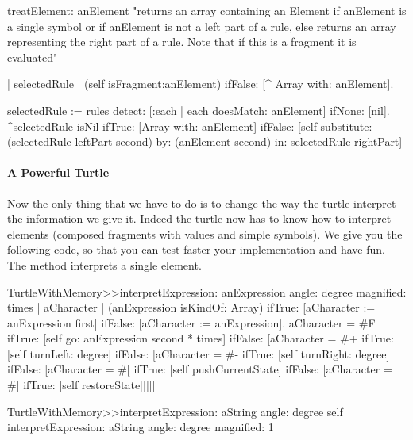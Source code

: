 \begin{method}
treatElement: anElement 
   "returns an array containing an Element if anElement is a single symbol
   or if anElement is not a left part of a rule, else returns an array representing the    
   right part of a rule. Note that if this is a fragment it is evaluated"
        
   | selectedRule |
   (self isFragment:anElement) 
          ifFalse: [^ Array with: anElement].

   selectedRule := rules detect: [:each | each doesMatch: anElement]
                         ifNone: [nil].
   ^selectedRule isNil 
       ifTrue: [Array with: anElement]
       ifFalse: [self substitute: (selectedRule leftPart second)                        
                      by: (anElement second)  
                      in: selectedRule rightPart]
\end{method}

\paragraph{A Powerful Turtle}
Now the only thing that we have to do is to change the way the turtle
interpret the information we give it. Indeed the turtle now has to
know how to interpret elements (composed fragments with values and
simple symbols). We give you the following code, so that you can test
faster your implementation and have fun.  The method
interprets a single element.

\begin{method}
TurtleWithMemory>>interpretExpression: anExpression angle: degree magnified: times 
   | aCharacter |
   (anExpression isKindOf: Array)
      ifTrue: [aCharacter := anExpression first]
      ifFalse: [aCharacter := anExpression].
   aCharacter = #F
      ifTrue: [self go: anExpression second * times]
      ifFalse: [aCharacter = #+
	          ifTrue: [self turnLeft: degree]
                  ifFalse: [aCharacter = #-
                                ifTrue: [self turnRight: degree]
                                ifFalse: [aCharacter = #[
                                              ifTrue: [self pushCurrentState]
                                              ifFalse: [aCharacter = #] 
                                                          ifTrue: [self restoreState]]]]]
\end{method}

\begin{method}
TurtleWithMemory>>interpretExpression: aString angle: degree 
   self
      interpretExpression: aString
      angle: degree
      magnified: 1
\end{method}

